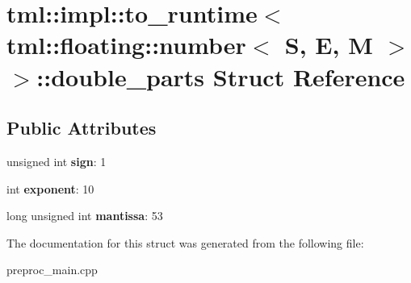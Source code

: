 \hypertarget{structtml_1_1impl_1_1to__runtime_3_01tml_1_1floating_1_1number_3_01S_00_01E_00_01M_01_4_01_4_1_1double__parts}{\section{tml\+:\+:impl\+:\+:to\+\_\+runtime$<$ tml\+:\+:floating\+:\+:number$<$ S, E, M $>$ $>$\+:\+:double\+\_\+parts Struct Reference}
\label{structtml_1_1impl_1_1to__runtime_3_01tml_1_1floating_1_1number_3_01S_00_01E_00_01M_01_4_01_4_1_1double__parts}
}
\subsection*{Public Attributes}
\begin{DoxyCompactItemize}
\item 
\hypertarget{structtml_1_1impl_1_1to__runtime_3_01tml_1_1floating_1_1number_3_01S_00_01E_00_01M_01_4_01_4_1_1double__parts_acd3fc17e1993fb20fed3ea0e59e69c42}{unsigned int {\bfseries sign}\+: 1}\label{structtml_1_1impl_1_1to__runtime_3_01tml_1_1floating_1_1number_3_01S_00_01E_00_01M_01_4_01_4_1_1double__parts_acd3fc17e1993fb20fed3ea0e59e69c42}

\item 
\hypertarget{structtml_1_1impl_1_1to__runtime_3_01tml_1_1floating_1_1number_3_01S_00_01E_00_01M_01_4_01_4_1_1double__parts_a2de55fedee92a752f068383c97a20049}{int {\bfseries exponent}\+: 10}\label{structtml_1_1impl_1_1to__runtime_3_01tml_1_1floating_1_1number_3_01S_00_01E_00_01M_01_4_01_4_1_1double__parts_a2de55fedee92a752f068383c97a20049}

\item 
\hypertarget{structtml_1_1impl_1_1to__runtime_3_01tml_1_1floating_1_1number_3_01S_00_01E_00_01M_01_4_01_4_1_1double__parts_aa4864491e77138fb1d0ef3c51748fa7d}{long unsigned int {\bfseries mantissa}\+: 53}\label{structtml_1_1impl_1_1to__runtime_3_01tml_1_1floating_1_1number_3_01S_00_01E_00_01M_01_4_01_4_1_1double__parts_aa4864491e77138fb1d0ef3c51748fa7d}

\end{DoxyCompactItemize}


The documentation for this struct was generated from the following file\+:\begin{DoxyCompactItemize}
\item 
preproc\+\_\+main.\+cpp\end{DoxyCompactItemize}
